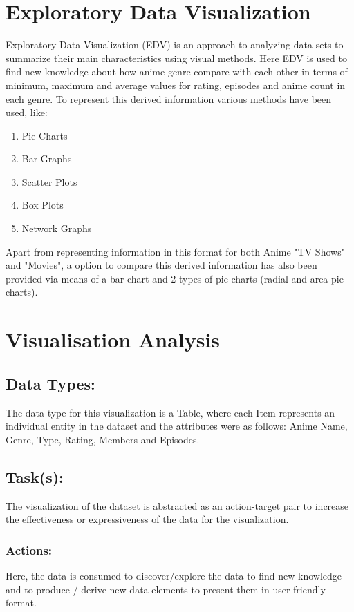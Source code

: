 \documentclass[a4paper, 10pt]{article}
\begin{document}
\section{Exploratory Data Visualization}
    \qquad Exploratory Data Visualization (EDV) is an approach to analyzing data sets to summarize their main characteristics using visual methods. Here EDV is used to find new knowledge about how anime genre compare with each other in terms of minimum, maximum and average values for rating, episodes and anime count in each genre. To represent this derived information various methods have been used, like:
    \begin{enumerate}
        \item Pie Charts
        \item Bar Graphs
        \item Scatter Plots
        \item Box Plots
        \item Network Graphs
    \end{enumerate}
    \qquad Apart from representing information in this format for both Anime "TV Shows" and "Movies", a option to compare this derived information has also been provided via means of a bar chart and 2 types of pie charts (radial and area pie charts).
    
\section{Visualisation Analysis}
    \subsection{Data Types:}
    \qquad The data type for this visualization is a Table, where each Item represents an individual entity in the dataset and the attributes were as follows: Anime Name, Genre, Type, Rating, Members and Episodes.
    
    \subsection{Task(s):}
    \qquad The visualization of the dataset is abstracted as an action-target pair to increase the effectiveness or expressiveness of the data for the visualization.
    \subsubsection{Actions:}
    \qquad Here, the data is consumed to discover/explore the data to find new knowledge and to produce / derive new data elements to present them in user friendly format.
\end{document}
